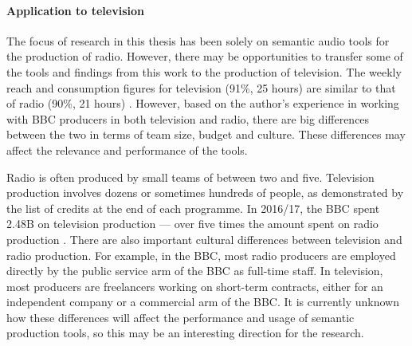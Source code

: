 \paragraph{Application to television}

The focus of research in this thesis has been solely on semantic audio tools for the production of radio. However,
there may be opportunities to transfer some of the tools and findings from this work to the production of television.
The weekly reach and consumption figures for television (91\%, 25 hours) are similar to that of radio (90\%, 21 hours)
\citep[pp.  82, 119]{Ofcom2017}.  However, based on the author's experience in working with BBC producers in both
television and radio, there are big differences between the two in terms of team size, budget and culture. These
differences may affect the relevance and performance of the tools.

Radio is often produced by small teams of between two and five. Television production involves dozens or sometimes
hundreds of people, as demonstrated by the list of credits at the end of each programme.  In 2016/17, the BBC spent
\textsterling2.48B on television production --- over five times the amount spent on radio production \citep[pp.  39,
111]{Ofcom2017}. There are also important cultural differences between television and radio production. For example, in
the BBC, most radio producers are employed directly by the public service arm of the BBC as full-time staff. In
television, most producers are freelancers working on short-term contracts, either for an independent company or a
commercial arm of the BBC.  It is currently unknown how these differences will affect the performance and usage of
semantic production tools, so this may be an interesting direction for the research.





